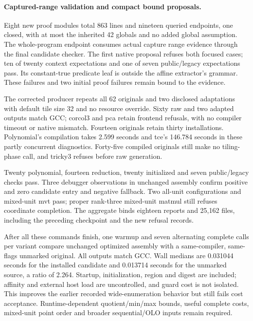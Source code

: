 \paragraph{Captured-range validation and compact bound proposals.}
Eight new proof modules total 863 lines and nineteen queried endpoints, one
closed, with at most the inherited 42 globals and no added global assumption.
The whole-program endpoint consumes actual capture range evidence through the
final candidate checker. The first native proposal refuses both focused cases;
ten of twenty context expectations and one of seven public/legacy expectations
pass. Its constant-true predicate leaf is outside the affine extractor's grammar.
These failures and two initial proof failures remain bound to the evidence.

The corrected producer repeats all 62 originals and two disclosed adaptations
with default tile size 32 and no resource override. Sixty raw and two adapted
outputs match GCC; corcol3 and pca retain frontend refusals, with no compiler
timeout or native mismatch. Fourteen originals retain thirty installations.
Polynomial's compilation takes 2.599 seconds and tce's 146.784 seconds in these
partly concurrent diagnostics. Forty-five compiled originals still make no
tiling-phase call, and tricky3 refuses before raw generation.

Twenty polynomial, fourteen reduction, twenty initialized and seven public/legacy
checks pass. Three debugger observations in unchanged assembly confirm positive
and zero candidate entry and negative fallback. Two all-unit configurations and
mixed-unit mvt pass; proper rank-three mixed-unit matmul still refuses coordinate
completion. The aggregate binds eighteen reports and 25,162 files, including
the preceding checkpoint and the new refusal records.

After all these commands finish, one warmup and seven alternating complete calls
per variant compare unchanged optimized assembly with a same-compiler, same-flags
unmarked original. All outputs match GCC. Wall medians are 0.031044 seconds for
the installed candidate and 0.013714 seconds for the unmarked source, a ratio
of 2.264. Startup, initialization, region and digest are included; affinity and
external host load are uncontrolled, and guard cost is not isolated. This
improves the earlier recorded wide-enumeration behavior but still fails cost
acceptance. Runtime-dependent quotient/min/max bounds, useful complete costs,
mixed-unit point order and broader sequential/OLO inputs remain required.

